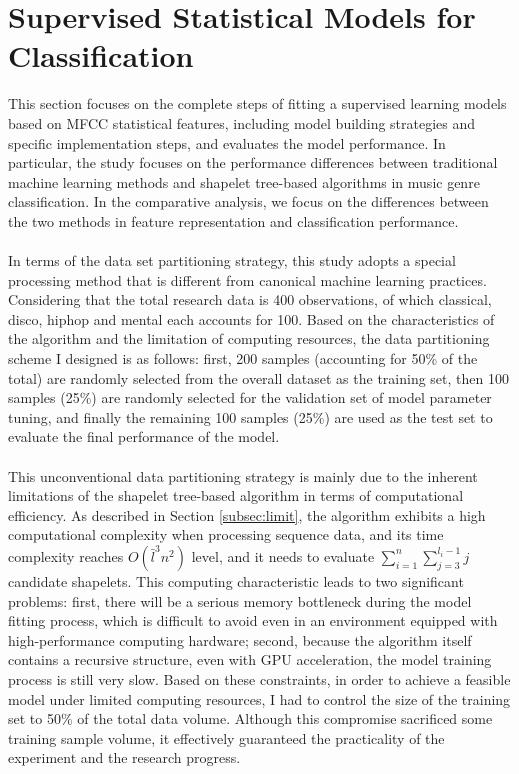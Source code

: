 \section{Supervised Statistical Models for Classification}
This section focuses on the complete steps of fitting a supervised learning models based on MFCC statistical features, including model building strategies and specific implementation steps, and evaluates the model performance. In particular, the study focuses on the performance differences between traditional machine learning methods and shapelet tree-based algorithms in music genre classification. In the comparative analysis, we focus on the differences between the two methods in feature representation and classification performance.\\
\\
In terms of the data set partitioning strategy, this study adopts a special processing method that is different from canonical machine learning practices. Considering that the total research data is 400 observations, of which classical, disco, hiphop and mental each accounts for 100. Based on the characteristics of the algorithm and the limitation of computing resources, the data partitioning scheme I designed is as follows: first, 200 samples (accounting for 50\% of the total) are randomly selected from the overall dataset as the training set, then 100 samples (25\%) are randomly selected for the validation set of model parameter tuning, and finally the remaining 100 samples (25\%) are used as the test set to evaluate the final performance of the model.\\
﻿\\
This unconventional data partitioning strategy is mainly due to the inherent limitations of the shapelet tree-based algorithm in terms of computational efficiency. As described in Section \ref{subsec:limit}, the algorithm exhibits a high computational complexity when processing sequence data, and its time complexity reaches $O(\bar{l}^3n^2)$ level, and it needs to evaluate $\sum_{i=1}^n\sum_{j=3}^{l_i-1} j$ candidate shapelets. This computing characteristic leads to two significant problems: first, there will be a serious memory bottleneck during the model fitting process, which is difficult to avoid even in an environment equipped with high-performance computing hardware; second, because the algorithm itself contains a recursive structure, even with GPU acceleration, the model training process is still very slow. Based on these constraints, in order to achieve a feasible model under limited computing resources, I had to control the size of the training set to 50\% of the total data volume. Although this compromise sacrificed some training sample volume, it effectively guaranteed the practicality of the experiment and the research progress.\\
\\

